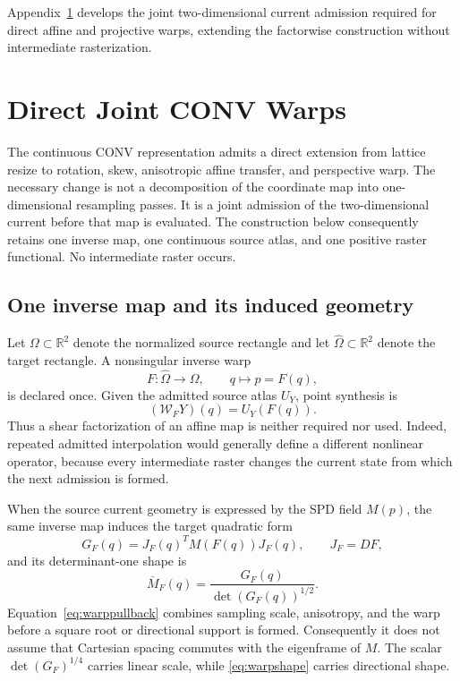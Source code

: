 \documentclass[journal]{IEEEtran}
\newcommand{\R}{\mathbb{R}}
\begin{document}
Appendix~\ref{app:directwarp} develops the joint two-dimensional current
admission required for direct affine and projective warps, extending the
factorwise construction without intermediate rasterization.

\providecommand{\WarpFigureRoot}{../support_geometry}
\appendices
\section{Direct Joint CONV Warps}
\label{app:directwarp}

The continuous CONV representation admits a direct extension from lattice
resize to rotation, skew, anisotropic affine transfer, and perspective warp.
The necessary change is not a decomposition of the coordinate map into
one-dimensional resampling passes.  It is a joint admission of the
two-dimensional current before that map is evaluated.  The construction
below consequently retains one inverse map, one continuous source atlas, and
one positive raster functional.  No intermediate raster occurs.

\subsection{One inverse map and its induced geometry}

Let \(\Omega\subset\R^2\) denote the normalized source rectangle and let
\(\widehat\Omega\subset\R^2\) denote the target rectangle.  A nonsingular
inverse warp
\begin{equation}
 F:\widehat\Omega\longrightarrow\Omega,\qquad q\longmapsto p=F(q),
 \label{eq:warpmap}
\end{equation}
is declared once.  Given the admitted source atlas \(U_Y\), point synthesis is
\begin{equation}
 (\mathcal W_FY)(q)=U_Y(F(q)).
 \label{eq:warppoint}
\end{equation}
Thus a shear factorization of an affine map is neither required nor used.
Indeed, repeated admitted interpolation would generally define a different
nonlinear operator, because every intermediate raster changes the current
state from which the next admission is formed.

When the source current geometry is expressed by the SPD field \(M(p)\), the
same inverse map induces the target quadratic form
\begin{equation}
 G_F(q)=J_F(q)^TM(F(q))J_F(q),
 \qquad J_F=DF,
 \label{eq:warppullback}
\end{equation}
and its determinant-one shape is
\begin{equation}
 \overline M_F(q)=\frac{G_F(q)}{\det(G_F(q))^{1/2}}.
 \label{eq:warpshape}
\end{equation}
Equation~\eqref{eq:warppullback} combines sampling scale, anisotropy, and the
warp before a square root or directional support is formed.  Consequently it
does not assume that Cartesian spacing commutes with the eigenframe of
\(M\).  The scalar \(\det(G_F)^{1/4}\) carries linear scale, while
\eqref{eq:warpshape} carries directional shape.
\end{document}
